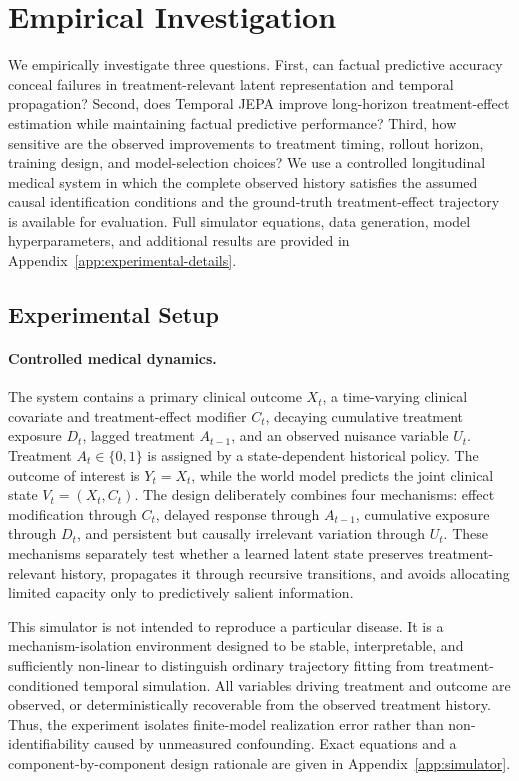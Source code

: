 \section{Empirical Investigation}
\label{sec:experiments}

We empirically investigate three questions. First, can factual
predictive accuracy conceal failures in treatment-relevant latent
representation and temporal propagation? Second, does Temporal JEPA
improve long-horizon treatment-effect estimation while maintaining
factual predictive performance? Third, how sensitive are the observed
improvements to treatment timing, rollout horizon, training design, and
model-selection choices? We use a controlled longitudinal medical
system in which the complete observed history satisfies the assumed
causal identification conditions and the ground-truth treatment-effect
trajectory is available for evaluation. Full simulator equations, data
generation, model hyperparameters, and additional results are provided
in Appendix~\ref{app:experimental-details}.

\subsection{Experimental Setup}
\label{sec:experimental-setup}

\paragraph{Controlled medical dynamics.}
The system contains a primary clinical outcome $X_t$, a time-varying
clinical covariate and treatment-effect modifier $C_t$, decaying
cumulative treatment exposure $D_t$, lagged treatment $A_{t-1}$, and
an observed nuisance variable $U_t$. Treatment $A_t\in\{0,1\}$ is
assigned by a state-dependent historical policy. The outcome of
interest is $Y_t=X_t$, while the world model predicts the joint clinical
state $V_t=(X_t,C_t)$. The design deliberately combines four mechanisms:
effect modification through $C_t$, delayed response through $A_{t-1}$,
cumulative exposure through $D_t$, and persistent but causally
irrelevant variation through $U_t$. These mechanisms separately test
whether a learned latent state preserves treatment-relevant history,
propagates it through recursive transitions, and avoids allocating
limited capacity only to predictively salient information.

This simulator is not intended to reproduce a particular disease. It is
a mechanism-isolation environment designed to be stable, interpretable,
and sufficiently non-linear to distinguish ordinary trajectory fitting
from treatment-conditioned temporal simulation. All variables driving
treatment and outcome are observed, or deterministically recoverable
from the observed treatment history. Thus, the experiment isolates
finite-model realization error rather than non-identifiability caused
by unmeasured confounding. Exact equations and a component-by-component
design rationale are given in Appendix~\ref{app:simulator}.

